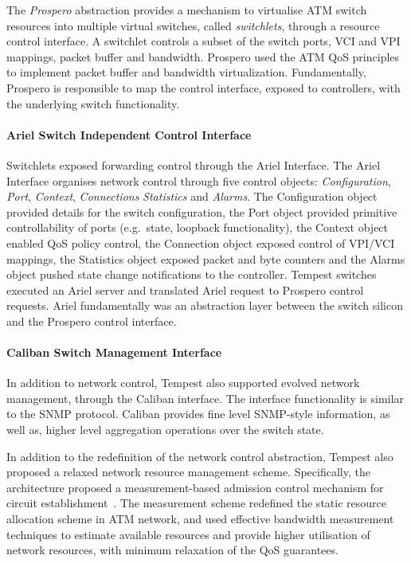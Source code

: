 The \emph{Prospero} abstraction provides a mechanism to virtualise ATM switch
resources into multiple virtual switches, called \emph{switchlets}, through a
resource control interface.  A switchlet controls a subset of the switch ports,
VCI and VPI mappings, packet buffer and bandwidth. Prospero used the ATM QoS
principles to implement packet buffer and bandwidth virtualization.
Fundamentally, Prospero is responsible to map the control interface, exposed to
controllers, with the underlying switch functionality. 

\paragraph{Ariel Switch Independent Control Interface} 

Switchlets exposed forwarding control through the Ariel Interface. The Ariel
Interface organises network control through five control objects:
\emph{Configuration}, \emph{Port}, \emph{Context}, {\it Connections}
\emph{Statistics} and \emph{Alarms}.  The Configuration object provided details
for the switch configuration, the Port object provided primitive controllability
of ports (e.g.~state, loopback functionality), the Context object enabled QoS
policy control, the Connection object exposed control of VPI/VCI mappings, the
Statistics object exposed packet and byte counters and the Alarms object pushed
state change notifications to the controller. Tempest switches executed an Ariel
server and translated Ariel request to Prospero control requests. Ariel
fundamentally was an abstraction layer between the switch silicon and the
Prospero control interface. 

\paragraph{Caliban Switch Management Interface}

In addition to network control, Tempest also supported evolved network
management, through the Caliban interface. The interface functionality is
similar to the SNMP protocol. Caliban provides fine level SNMP-style
information, as well as, higher level aggregation operations over the switch
state. 

In addition to the redefinition of the network control abstraction, Tempest also
proposed a relaxed network resource management scheme.  Specifically, the
architecture proposed a measurement-based admission control mechanism for
circuit establishment~. The measurement scheme redefined the
static resource allocation scheme in ATM network, and used effective bandwidth
measurement techniques to estimate available resources and provide higher
utilisation of network resources, with minimum relaxation of the QoS guarantees. 

